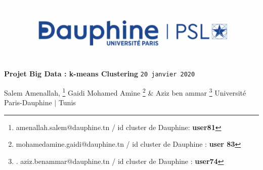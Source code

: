 \documentclass[12pt]{article}
\title{}
\numberwithin{equation}{section}
\theoremstyle{plain}
\def\v1{\vskip0.2cm}
\begin{document}
\begin{center}
\begin{figure}
\includegraphics[width=18cm]{images} 
\end{figure}
\begin{center}{\Huge\textbf{Projet Big Data : k-means Clustering}\v1
 \texttt{20 janvier 2020}
}\vskip1cm
\begin{center}
Salem Amenallah,  \footnote{amenallah.salem@dauphine.tn
/ id cluster de Dauphine: \textbf{user81}
} Gaidi Mohamed Amine \footnote{mohamedamine.gaidi@dauphine.tn / id cluster de Dauphine : \textbf{user 83}
} \& Aziz ben ammar \footnote{. aziz.benammar@dauphine.tn / id cluster de Dauphine : \textbf{user74}
}\v1
Université Paris-Dauphine $|$ Tunis


\end{center}

\end{center}
\end{center}




\tableofcontents
\newpage



\end{document}
